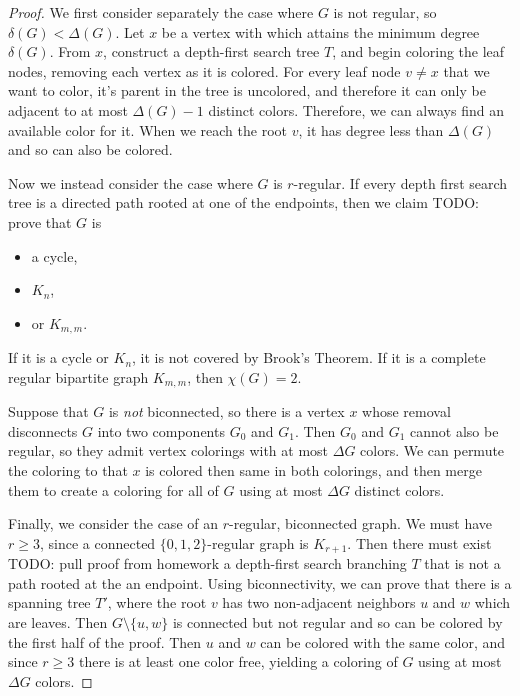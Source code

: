 \begin{proof}
    We first consider separately the case where $G$ is not regular, so $\delta(G) < \Delta(G)$. Let $x$ be a vertex with which attains the minimum degree $\delta(G)$. From $x$, construct a depth-first search tree $T$, and begin coloring the leaf nodes, removing each vertex as it is colored. For every leaf node $v \neq x$ that we want to color, it's parent in the tree is uncolored, and therefore it can only be adjacent to at most $\Delta(G)-1$ distinct colors. Therefore, we can always find an available color for it. When we reach the root $v$, it has degree less than $\Delta(G)$ and so can also be colored.

    Now we instead consider the case where $G$ is $r$-regular. If every depth first search tree is a directed path rooted at one of the endpoints, then we claim {\color{red}TODO: prove} that $G$ is
    \begin{itemize}
        \item a cycle,
        \item $K_n$,
        \item or $K_{m,m}$.
    \end{itemize}
    If it is a cycle or $K_n$, it is not covered by Brook's Theorem. If it is a complete regular bipartite graph $K_{m,m}$, then $\chi(G) = 2$.

    Suppose that $G$ is \emph{not} biconnected, so there is a vertex $x$ whose removal disconnects $G$ into two components $G_0$ and $G_1$. Then $G_0$ and $G_1$ cannot also be regular, so they admit vertex colorings with at most $\Delta G$ colors. We can permute the coloring to that $x$ is colored then same in both colorings, and then merge them to create a coloring for all of $G$ using at most $\Delta G$ distinct colors.

    Finally, we consider the case of an $r$-regular, biconnected graph. We must have $r \geq 3$, since a connected $\{0, 1, 2\}$-regular graph is $K_{r+1}$. Then there must exist {\color{red}TODO: pull proof from homework} a depth-first search branching $T$ that is not a path rooted at the an endpoint. Using biconnectivity, we can prove that there is a spanning tree $T'$, where the root $v$ has two non-adjacent neighbors $u$ and $w$ which are leaves. Then $G \setminus \{u, w\}$ is connected but not regular and so can be colored by the first half of the proof. Then $u$ and $w$ can be colored with the same color, and since $r \geq 3$ there is at least one color free, yielding a coloring of $G$ using at most $\Delta G$ colors.
\end{proof}

